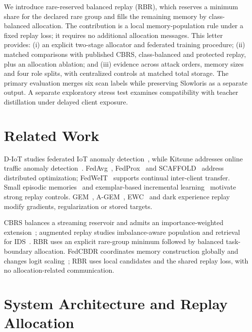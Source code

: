 \documentclass[journal,10pt]{IEEEtran}
\begin{document}
We introduce rare-reserved balanced replay (RBR), which reserves a minimum share for the declared rare group and fills the remaining memory by class-balanced allocation. The contribution is a local memory-population rule under a fixed replay loss; it requires no additional allocation messages. This letter provides: (i) an explicit two-stage allocator and federated training procedure; (ii) matched comparisons with published CBRS, class-balanced and protected replay, plus an allocation ablation; and (iii) evidence across attack orders, memory sizes and four role splits, with centralized controls at matched total storage. The primary evaluation merges six scan labels while preserving Slowloris as a separate output. A separate exploratory stress test examines compatibility with teacher distillation under delayed client exposure.

\section{Related Work}
D-IoT studies federated IoT anomaly detection~\cite{diot}, while Kitsune addresses online traffic anomaly detection~\cite{kitsune}. FedAvg~\cite{fedavg}, FedProx~\cite{fedprox} and SCAFFOLD~\cite{scaffold} address distributed optimization; FedWeIT~\cite{fedweit} supports continual inter-client transfer. Small episodic memories~\cite{tiny} and exemplar-based incremental learning~\cite{icarl} motivate strong replay controls. GEM~\cite{gem}, A-GEM~\cite{agem}, EWC~\cite{ewc} and dark experience replay~\cite{der} modify gradients, regularization or stored targets.

CBRS balances a streaming reservoir and admits an importance-weighted extension~\cite{cbrs}; augmented replay studies imbalance-aware population and retrieval for IDS~\cite{amr}. RBR uses an explicit rare-group minimum followed by balanced task-boundary allocation. FedCBDR coordinates memory construction globally and changes logit scaling~\cite{fedcbdr}; RBR uses local candidates and the shared replay loss, with no allocation-related communication.

\section{System Architecture and Replay Allocation}
\end{document}
